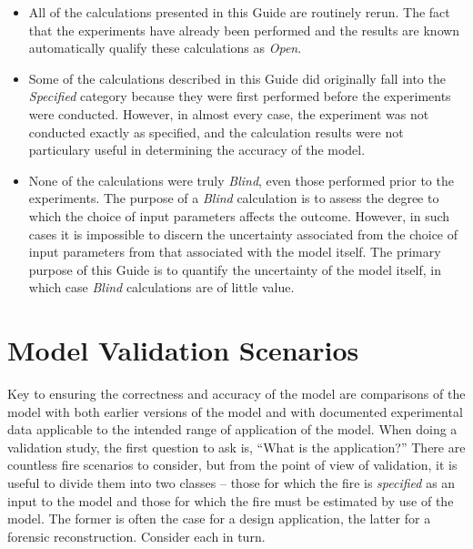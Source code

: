 \begin{itemize}
\item All of the calculations presented in this Guide are routinely rerun. The
fact that the experiments have already been performed and the results are known automatically qualify these
calculations as {\em Open}.
\item Some of the calculations described in this Guide did originally fall into the {\em Specified} category because they
were first performed before the experiments were conducted. However, in almost every case, the experiment was not conducted
exactly as specified, and the calculation results were not particulary useful in determining the accuracy of the model.
\item None of the calculations were truly {\em Blind}, even those performed prior to the experiments. The purpose of a
{\em Blind} calculation is to assess the degree to which the choice of input parameters affects the outcome. However,
in such cases it is impossible to discern the uncertainty associated from the choice of input parameters from that associated
with the model itself. The primary purpose of this Guide is to quantify the uncertainty of the model itself, in which
case {\em Blind} calculations are of little value.
\end{itemize}



\section{Model Validation Scenarios}

Key to ensuring the correctness and accuracy of the model are comparisons of the model with both earlier versions of the model and with documented experimental data applicable to the intended range of application of the model. When doing a validation study, the first question to ask is, ``What is the application?'' There are countless fire scenarios to consider, but from the point of view of validation, it is useful to divide them into two classes -- those for which the fire is {\em specified} as an input to the model and those for which the fire must be estimated by use of the model. The former is often the case for a design application, the latter for a forensic reconstruction. Consider each in turn.


